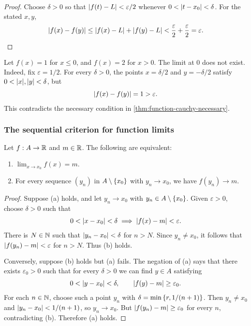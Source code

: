 \documentclass[11pt,a4paper]{amsart}
\begin{document}
\begin{proof}
  Choose \(\delta>0\) so that \(\lvert f(t)-L\rvert<\varepsilon/2\)
  whenever \(0<\lvert t-x_0\rvert<\delta\). For the stated \(x,y\),
  \[
    \lvert f(x)-f(y)\rvert\leq\lvert f(x)-L\rvert+\lvert f(y)-L\rvert
    <\frac\varepsilon2+\frac\varepsilon2=\varepsilon.
  \]
\end{proof}

\begin{example}
  Let \(f(x)=1\) for \(x\leq0\), and \(f(x)=2\) for \(x>0\).
  The limit at \(0\) does not exist. Indeed, fix \(\varepsilon=1/2\).
  For every \(\delta>0\), the points \(x=\delta/2\) and
  \(y=-\delta/2\) satisfy \(0<\lvert x\rvert,\lvert y\rvert<\delta\), but
  \[
    \lvert f(x)-f(y)\rvert=1>\varepsilon.
  \]
  This contradicts the necessary condition in
  \cref{thm:function-cauchy-necessary}.
\end{example}

\subsubsection{The sequential criterion for function limits}

\begin{theorem}\label{thm:function-sequential}
  Let \(f:A\to\mathbb{R}\) and \(m\in\mathbb{R}\). The following are equivalent:
  \begin{enumerate}[label=(\alph*)]
    \item \(\lim_{x\to x_0}f(x)=m\).
    \item For every sequence \((y_n)\) in \(A\setminus\left\lbrace x_0\right\rbrace\)
      with \(y_n\to x_0\), we have \(f(y_n)\to m\).
  \end{enumerate}
\end{theorem}

\begin{proof}
  Suppose (a) holds, and let \(y_n\to x_0\) with
  \(y_n\in A\setminus\left\lbrace x_0\right\rbrace\). Given \(\varepsilon>0\), choose
  \(\delta>0\) such that
  \[
    0<\lvert x-x_0\rvert<\delta\implies\lvert f(x)-m\rvert<\varepsilon.
  \]
  There is \(N\in\mathbb{N}\) such that \(\lvert y_n-x_0\rvert<\delta\)
  for \(n>N\). Since \(y_n\neq x_0\), it follows that
  \(\lvert f(y_n)-m\rvert<\varepsilon\) for \(n>N\). Thus (b) holds.

  Conversely, suppose (b) holds but (a) fails. The negation of (a)
  says that there exists \(\varepsilon_0>0\) such that for every
  \(\delta>0\) we can find \(y\in A\) satisfying
  \[
    0<\lvert y-x_0\rvert<\delta,
    \qquad \lvert f(y)-m\rvert\geq\varepsilon_0.
  \]
  For each \(n\in\mathbb{N}\), choose such a point \(y_n\) with
  \(\delta=\min\left\lbrace r,1/(n+1)\right\rbrace\). Then \(y_n\neq x_0\) and
  \(\lvert y_n-x_0\rvert<1/(n+1)\), so \(y_n\to x_0\). But
  \(\lvert f(y_n)-m\rvert\geq\varepsilon_0\) for every \(n\),
  contradicting (b). Therefore (a) holds.
\end{proof}
\end{document}
